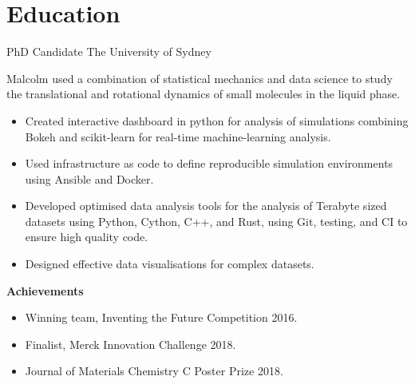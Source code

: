\section{Education}

{PhD Candidate}
{The University of Sydney}{}{}
{%
  Malcolm used a combination of statistical mechanics and data science to
  study the translational and rotational dynamics
  of small molecules in the liquid phase.
\begin{itemize}
  \item Created interactive dashboard in python for analysis of simulations
    combining Bokeh and scikit-learn for real-time machine-learning analysis.
  \item Used infrastructure as code to define reproducible simulation environments
    using Ansible and Docker.
  \item Developed optimised data analysis tools for the analysis of Terabyte sized
    datasets using Python, Cython, C++, and Rust,
    using Git, testing, and CI to ensure high quality code.
  \item Designed effective data visualisations for complex datasets.
\end{itemize}
\textbf{Achievements}
\begin{itemize}
  \item Winning team, Inventing the Future Competition 2016.
  \item Finalist, Merck Innovation Challenge 2018.
  \item Journal of Materials Chemistry C Poster Prize 2018.
\end{itemize}
}



